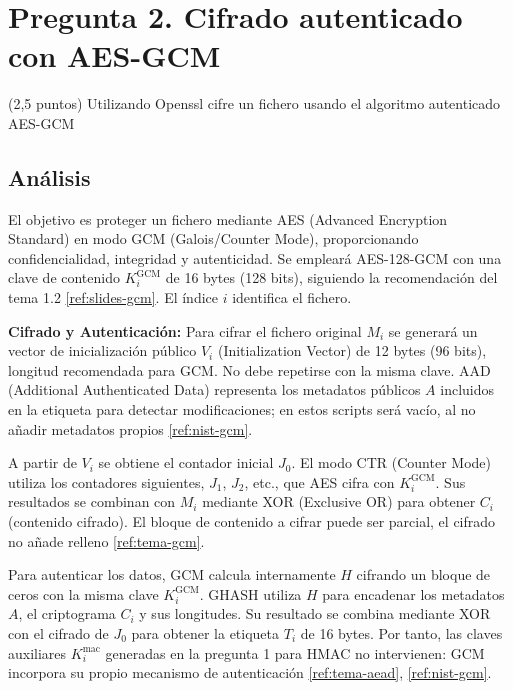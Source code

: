 \section{Pregunta 2. Cifrado autenticado con AES-GCM}
\label{sec:pregunta2}

\begin{enunciado}{(2,5 puntos)}
Utilizando Openssl cifre un fichero usando el algoritmo autenticado AES-GCM
\end{enunciado}

\subsection{Análisis}

El objetivo es proteger un fichero mediante AES (Advanced Encryption Standard) en modo GCM (Galois/Counter Mode), proporcionando confidencialidad, integridad y autenticidad. Se empleará AES-128-GCM con una clave de contenido $K_i^{\mathrm{GCM}}$ de 16 bytes (128 bits), siguiendo la recomendación del tema 1.2 \ref{ref:slides-gcm}. El índice $i$ identifica el fichero.

\textbf{Cifrado y Autenticación:} Para cifrar el fichero original $M_i$ se generará un vector de inicialización público $V_i$ (Initialization Vector) de 12 bytes (96 bits), longitud recomendada para GCM. No debe repetirse con la misma clave. AAD (Additional Authenticated Data) representa los metadatos públicos $A$ incluidos en la etiqueta para detectar modificaciones; en estos scripts será vacío, al no añadir metadatos propios \ref{ref:nist-gcm}.

A partir de $V_i$ se obtiene el contador inicial $J_0$. El modo CTR (Counter Mode) utiliza los contadores siguientes, $J_1$, $J_2$, etc., que AES cifra con $K_i^{\mathrm{GCM}}$. Sus resultados se combinan con $M_i$ mediante XOR (Exclusive OR) para obtener $C_i$ (contenido cifrado). El bloque de contenido a cifrar puede ser parcial, el cifrado no añade relleno \ref{ref:tema-gcm}.

Para autenticar los datos, GCM calcula internamente $H$ cifrando un bloque de ceros con la misma clave $K_i^{\mathrm{GCM}}$. GHASH utiliza $H$ para encadenar los metadatos $A$, el criptograma $C_i$ y sus longitudes. Su resultado se combina mediante XOR con el cifrado de $J_0$ para obtener la etiqueta $T_i$ de 16 bytes. Por tanto, las claves auxiliares $K_i^{\mathrm{mac}}$ generadas en la pregunta 1 para HMAC no intervienen: GCM incorpora su propio mecanismo de autenticación \ref{ref:tema-aead}, \ref{ref:nist-gcm}.

